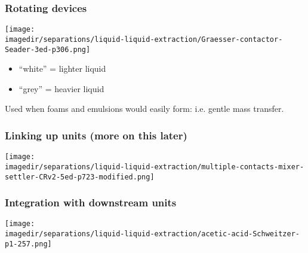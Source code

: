 \begin{frame}\frametitle{Rotating devices}
	\begin{center}
		\texttt{[image: \\imagedir/separations/liquid-liquid-extraction/Graesser-contactor-Seader-3ed-p306.png]}
	\end{center}
	\vspace{-12pt}
	\begin{itemize}
		\item	``white'' = lighter liquid
		\item	``grey'' = heavier liquid
	\end{itemize}
	Used when foams and emulsions would easily form: i.e. gentle mass transfer.
\end{frame}

\begin{frame}\frametitle{Linking up units (more on this later)}
	\begin{center}
		\texttt{[image: \\imagedir/separations/liquid-liquid-extraction/multiple-contacts-mixer-settler-CRv2-5ed-p723-modified.png]}
	\end{center}
\end{frame}

\begin{frame}\frametitle{Integration with downstream units}
	\begin{center}
		\texttt{[image: \\imagedir/separations/liquid-liquid-extraction/acetic-acid-Schweitzer-p1-257.png]}
	\end{center}
	\vspace{-10pt}
\end{frame}

